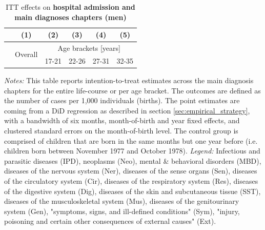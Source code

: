 \documentclass[11pt, a4paper,draft]{article} %
\begin{document}
\newpage
{} 
\vspace*{\fill}
\begin{table}[H] \centering 
	\begin{threeparttable} \centering \caption{ITT effects on \textbf{hospital admission and main diagnoses chapters (men)}}\label{tab: ITT_across_chapters_per_age_group_men}
		{\def\sym#1{\ifmmode^{#1}\else\(^{#1}\)\fi} 
			\begin{tabular}{l*{5}{c}}
				\toprule 
				&\multicolumn{1}{c}{(1)}&\multicolumn{1}{c}{(2)}&\multicolumn{1}{c}{(3)}&\multicolumn{1}{c}{(4)}&\multicolumn{1}{c}{(5)}\\
				\midrule
				&\multirow{2}{*}{Overall} & \multicolumn{4}{c}{Age brackets [years]} \\ 
				\cmidrule(lr){3-6}
				&&\multicolumn{1}{c}{17-21}&\multicolumn{1}{c}{22-26}&\multicolumn{1}{c}{27-31}&\multicolumn{1}{c}{32-35}\\
				
				\midrule
				
				
				
				\bottomrule 
		\end{tabular}}
	\end{threeparttable} 
	\begin{minipage}{0.9\linewidth}
		\scriptsize \emph{Notes:} This table reports intention-to-treat estimates across the main diagnosis chapters for the entire life-course or per age bracket. The outcomes are defined as the number of cases per 1,000 individuals (births). The point estimates are coming from a DiD regression as described in section \ref{sec:empirical_strategy}, with a bandwidth of six months, month-of-birth and year fixed effects, and clustered standard errors on the month-of-birth level. The control group is comprised of children that are born in the same months but one year before (i.e. children born between November 1977 and October 1978).\newline
		\emph{Legend:} Infectious and parasitic diseases (IPD), neoplasms (Neo), mental \& behavioral disorders (MBD), diseases of the nervous system (Ner), diseases of the sense organs (Sen), diseases of the circulatory system (Cir), diseases of the respiratory system (Res), diseases of the digestive system (Dig), diseases of the skin and subcutaneous tissue (SST), diseases of the musculoskeletal system (Mus), diseases of the genitourinary system (Gen), "symptoms, signs, and ill-defined conditions" (Sym), "injury, poisoning and certain other consequences of external causes" (Ext).
	\end{minipage}
\end{table} 
\vspace*{\fill}\clearpage 
\restoregeometry
\end{document}
